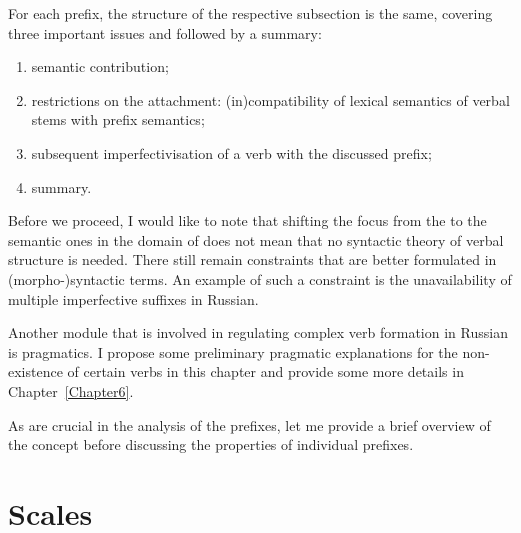 For each prefix, the structure of the respective subsection is the same, covering three important issues and followed by a summary:
\begin{enumerate}
\item semantic contribution;
\item restrictions on the attachment: (in)compatibility of lexical semantics of verbal stems with prefix semantics;
\item subsequent imperfectivisation of a verb with the discussed prefix;
\item summary.
\end{enumerate}


Before we proceed, I would like to note that shifting the focus from the  to the semantic ones in the domain of  does not mean that no syntactic theory of verbal structure is needed. There still remain constraints that are better formulated in (morpho-)syntactic terms. An example of such a constraint is the unavailability of multiple imperfective suffixes in Russian. 

Another module that is involved in regulating complex verb formation in Russian is pragmatics. I propose some preliminary pragmatic explanations for the non-existence of certain verbs in this chapter and provide some more details in Chapter~\ref{Chapter6}.

As  are crucial in the analysis of the prefixes, let me provide a brief overview of the concept before discussing the properties of individual prefixes.

\section{Scales}


